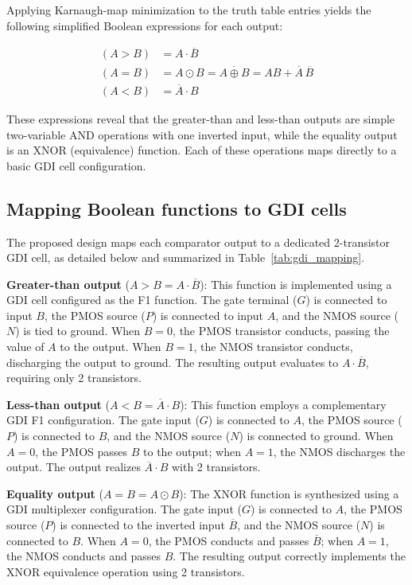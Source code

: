 \documentclass[final,5p,times,twocolumn]{elsarticle}
\begin{document}
Applying Karnaugh-map minimization to the truth table entries yields the following simplified Boolean expressions for each output:

\begin{align}
    (A > B) &= A \cdot \overline{B} \label{eq:agb} \\
    (A = B) &= A \odot B = \overline{A \oplus B} = A B + \overline{A}\,\overline{B} \label{eq:aeb} \\
    (A < B) &= \overline{A} \cdot B \label{eq:alb}
\end{align}

These expressions reveal that the greater-than and less-than outputs are simple two-variable AND operations with one inverted input, while the equality output is an XNOR (equivalence) function. Each of these operations maps directly to a basic GDI cell configuration.

\subsection{Mapping Boolean functions to GDI cells}

The proposed design maps each comparator output to a dedicated 2-transistor GDI cell, as detailed below and summarized in Table~\ref{tab:gdi_mapping}.

\textbf{Greater-than output} ($A > B = A \cdot \overline{B}$): This function is implemented using a GDI cell configured as the F1 function. The gate terminal ($G$) is connected to input $B$, the PMOS source ($P$) is connected to input $A$, and the NMOS source ($N$) is tied to ground. When $B = 0$, the PMOS transistor conducts, passing the value of $A$ to the output. When $B = 1$, the NMOS transistor conducts, discharging the output to ground. The resulting output evaluates to $A \cdot \overline{B}$, requiring only 2 transistors.

\textbf{Less-than output} ($A < B = \overline{A} \cdot B$): This function employs a complementary GDI F1 configuration. The gate input ($G$) is connected to $A$, the PMOS source ($P$) is connected to $B$, and the NMOS source ($N$) is connected to ground. When $A = 0$, the PMOS passes $B$ to the output; when $A = 1$, the NMOS discharges the output. The output realizes $\overline{A} \cdot B$ with 2 transistors.

\textbf{Equality output} ($A = B = A \odot B$): The XNOR function is synthesized using a GDI multiplexer configuration. The gate input ($G$) is connected to $A$, the PMOS source ($P$) is connected to the inverted input $\overline{B}$, and the NMOS source ($N$) is connected to $B$. When $A = 0$, the PMOS conducts and passes $\overline{B}$; when $A = 1$, the NMOS conducts and passes $B$. The resulting output correctly implements the XNOR equivalence operation using 2 transistors.
\end{document}
